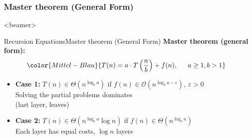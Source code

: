 
\subsubsection{Master theorem (General Form)}

\begin{frame}<beamer>{\LectureToC}
  \tableofcontents[currentsection,
    currentsubsection,
    subsubsectionstyle=show/shaded/shaded/shaded]
\end{frame}

\begin{frame}{Recursion Equations}{Master theorem (General Form)}
  \textbf{Master theorem (general form):}
  \begin{displaymath}
  \color{Mittel-Blau}{%
    T(n) = a \cdot T\left(\frac{n}{b}\right) + f(n),%
    \hspace{1.5em}a \geq 1, b > 1%
  }%
  \end{displaymath}
  \vspace{-1.0em}
  \begin{itemize}
    \item<3->
      \textbf{Case 1:}
      {\color{Mittel-Gruen}$T(n) \in \Theta(n^{\log_b a})$}
      \hfill if {\color{Mittel-Blau}
        $f(n) \in \mathcal{O}(n^{\log_b a-\varepsilon}), ~ \varepsilon > 0$
      }\\
      {\color{gray}Solving the partial problems dominates\\
        (last layer, leaves)}
      \vspace{1.5em}
    \item<4->
      \textbf{Case 2:}
      {\color{Mittel-Gruen}$T(n) \in \Theta(n^{\log_b a} \log n)$}
      \hspace{1.5em} if {\color{Mittel-Blau}
        $f(n) \in \Theta(n^{\log_b a})$
      }\\
      {\color{gray}Each layer has equal costs, $\log n$ layers}
  \end{itemize}
\end{frame}


